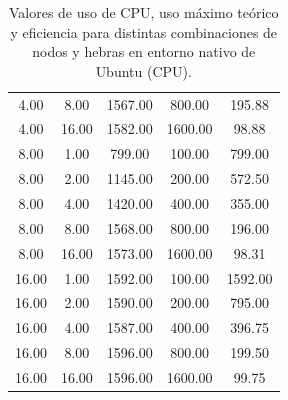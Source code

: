 \begin{table}[ht]
\begin{tabular}{|c|c|c|c|c|}
        4.00           & 8.00            & 1567.00                         & 800.00                    & 195.88                       \\
        4.00           & 16.00           & 1582.00                         & 1600.00                   & 98.88                        \\
        8.00           & 1.00            & 799.00                          & 100.00                    & 799.00                       \\
        8.00           & 2.00            & 1145.00                         & 200.00                    & 572.50                       \\
        8.00           & 4.00            & 1420.00                         & 400.00                    & 355.00                       \\
        8.00           & 8.00            & 1568.00                         & 800.00                    & 196.00                       \\
        8.00           & 16.00           & 1573.00                         & 1600.00                   & 98.31                        \\
        16.00          & 1.00            & 1592.00                         & 100.00                    & 1592.00                      \\
        16.00          & 2.00            & 1590.00                         & 200.00                    & 795.00                       \\
        16.00          & 4.00            & 1587.00                         & 400.00                    & 396.75                       \\
        16.00          & 8.00            & 1596.00                         & 800.00                    & 199.50                       \\
        16.00          & 16.00           & 1596.00                         & 1600.00                   & 99.75                        \\
        \hline
    \end{tabular}
    \caption{Valores de uso de CPU, uso máximo teórico y eficiencia para distintas combinaciones de nodos y hebras en entorno nativo de Ubuntu (CPU).}
    \label{tab:thread_sweep_ubuntu_cpu_native_cpu}
\end{table}

